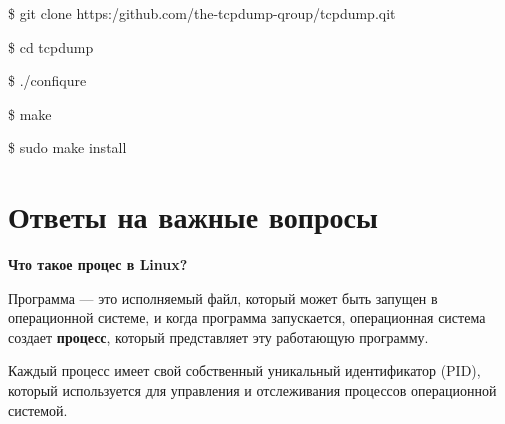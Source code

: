 \documentclass[oneside, final, 14pt]{extreport} %
\begin{document}
\$ git clone https:/github.com/the-tcpdump-qroup/tcpdump.qit

\$ cd tcpdump

\$ ./confiqure

\$ make

\$ sudo make install



\section{Ответы на важные вопросы}

\textbf{Что такое процес в Linux?}

Программа --- это исполняемый файл, который может быть запущен в операционной системе, и когда программа запускается, операционная система создает \textbf{процесс}, который представляет эту работающую программу.

Каждый процесс имеет свой собственный уникальный идентификатор (PID), который используется для управления и отслеживания процессов операционной системой.
\end{document}
